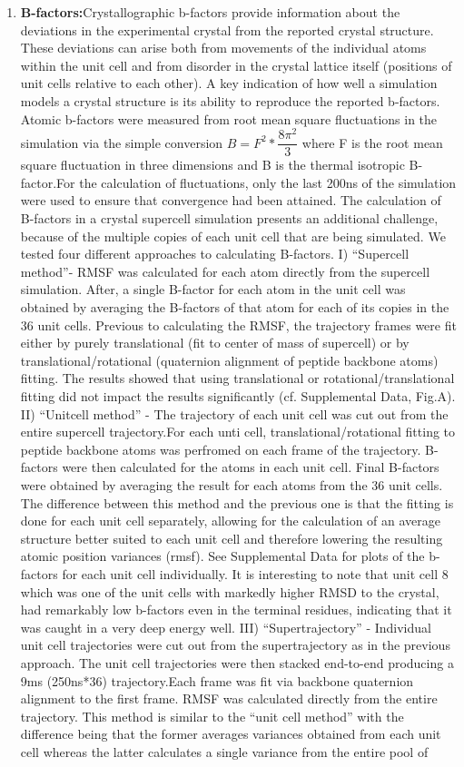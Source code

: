 \documentclass[12pt,letterpaper]{report}
\begin{document}
\begin{enumerate}
\item\textbf{B-factors:}Crystallographic b-factors provide information about the deviations in the experimental crystal from the reported crystal structure. These deviations can arise both from movements of the individual atoms within the unit cell and from disorder in the crystal lattice itself (positions of unit cells relative to each other). A key indication of how well a simulation models a crystal structure is its ability to reproduce the reported b-factors. Atomic b-factors were measured from root mean square fluctuations in the simulation via the simple conversion
$B=F^{2}*\dfrac{8\pi^{2}}{3}$
where F is the root mean square fluctuation in three dimensions and B is the thermal isotropic B-factor.For the calculation of fluctuations, only the last 200ns of the simulation were used to ensure that convergence had been attained. The calculation of B-factors in a crystal supercell simulation presents an additional challenge, because of the multiple copies of each unit cell that are being simulated. We tested four different approaches to calculating B-factors. I) ``Supercell method''- RMSF was calculated for each atom directly from the supercell simulation. After, a single B-factor for each atom in the unit cell was obtained by averaging the B-factors of that atom for each of its copies in the 36 unit cells. Previous to calculating the RMSF, the trajectory frames were fit either by purely translational (fit to center of mass of supercell) or by translational/rotational (quaternion alignment of peptide backbone atoms) fitting. The results showed that using translational or rotational/translational fitting did not impact the results significantly (cf. Supplemental Data, Fig.A). II) ``Unitcell method'' - The trajectory of each unit cell was cut out from the entire supercell trajectory.For each unti cell, translational/rotational fitting to peptide backbone atoms was perfromed on each frame of the trajectory. B-factors were then calculated for the atoms in each unit cell. Final B-factors were obtained by averaging the result for each atoms from the 36 unit cells. The difference between this method and the previous one is that the fitting is done for each unit cell separately, allowing for the calculation of an average structure better suited to each unit cell and therefore lowering the resulting atomic position variances (rmsf). See Supplemental Data for plots of the b-factors for each unit cell individually. It is interesting to note that unit cell 8 which was one of the unit cells with markedly higher RMSD to the crystal, had remarkably low b-factors even in the terminal residues, indicating that it was caught in a very deep energy well. III) ``Supertrajectory'' - Individual unit cell trajectories were cut out from the supertrajectory as in the previous approach. The unit cell trajectories were then stacked end-to-end producing a 9ms (250ns*36) trajectory.Each frame was fit via backbone quaternion alignment to the first frame. RMSF was calculated directly from the entire trajectory. This method is similar to the ``unit cell method'' with the difference being that the former averages variances obtained from each unit cell whereas the latter calculates a single variance from the entire pool of 
\end{enumerate}
\end{document}
